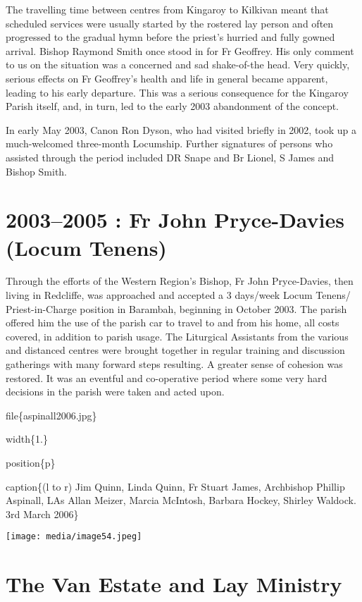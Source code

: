 The travelling time between centres from Kingaroy to Kilkivan meant that scheduled services were usually started by the rostered lay person and often progressed to the gradual hymn before the priest's hurried and fully gowned arrival. Bishop Raymond Smith once stood in for Fr Geoffrey. His only comment to us on the situation was a concerned and sad shake-of-the head. Very quickly, serious effects on Fr Geoffrey's health and life in general became apparent, leading to his early departure. This was a serious consequence for the Kingaroy Parish itself, and, in turn, led to the early 2003 abandonment of the concept.

In early May 2003, Canon Ron Dyson, who had visited briefly in 2002, took up a much-welcomed three-month Locumship. Further signatures of persons who assisted through the period included DR Snape and Br Lionel, S James and Bishop Smith.

\hypertarget{fr-john-pryce-davies-locum-tenens}{%
\section{2003--2005 : Fr John Pryce-Davies (Locum Tenens)}\label{fr-john-pryce-davies-locum-tenens}}

Through the efforts of the Western Region's Bishop, Fr John Pryce-Davies, then living in Redcliffe, was approached and accepted a 3 days/week Locum Tenens/ Priest-in-Charge position in Barambah, beginning in October 2003. The parish offered him the use of the parish car to travel to and from his home, all costs covered, in addition to parish usage. The Liturgical Assistants from the various and distanced centres were brought together in regular training and discussion gatherings with many forward steps resulting. A greater sense of cohesion was restored. It was an eventful and co-operative period where some very hard decisions in the parish were taken and acted upon.

file\{aspinall2006.jpg\}

width\{1.\}

position\{p\}

caption\{(l to r) Jim Quinn, Linda Quinn, Fr Stuart James, Archbishop Phillip Aspinall, LAs Allan Meizer, Marcia McIntosh, Barbara Hockey, Shirley Waldock. 3rd March 2006\}

\texttt{[image: media/image54.jpeg]}

\hypertarget{the-van-estate-and-lay-ministry}{%
\section{The Van Estate and Lay Ministry}\label{the-van-estate-and-lay-ministry}}

